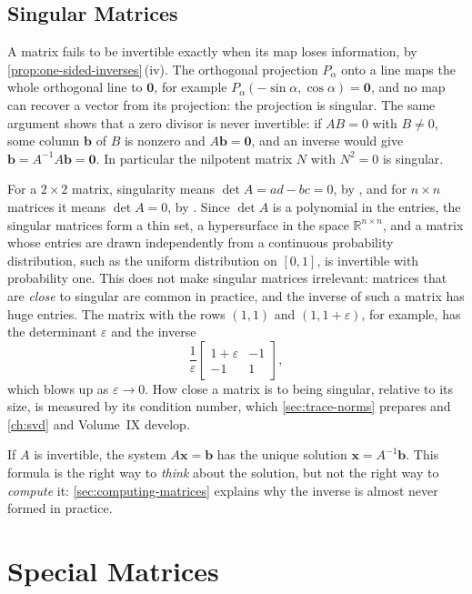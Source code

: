 \subsection{Singular Matrices}

A matrix fails to be invertible exactly when its map loses information, by \cref{prop:one-sided-inverses}\,(iv). The orthogonal projection $P_\alpha$ onto a line maps the whole orthogonal line to $\mathbf 0$, for example $P_\alpha(-\sin\alpha,\cos\alpha)=\mathbf 0$, and no map can recover a vector from its projection: the projection is singular. The same argument shows that a zero divisor is never invertible: if $AB=0$ with $B\ne0$, some column $\mathbf b$ of $B$ is nonzero and $A\mathbf b=\mathbf 0$, and an inverse would give $\mathbf b=A^{-1}A\mathbf b=\mathbf 0$. In particular the nilpotent matrix $N$ with $N^2=0$ is singular.

For a $2\times2$ matrix, singularity means $\det A=ad-bc=0$, by , and for $n\times n$ matrices it means $\det A=0$, by . Since $\det A$ is a polynomial in the entries, the singular matrices form a thin set, a hypersurface in the space $\mathbb R^{n\times n}$, and a matrix whose entries are drawn independently from a continuous probability distribution, such as the uniform distribution on $[0,1]$, is invertible with probability one. This does not make singular matrices irrelevant: matrices that are \emph{close} to singular are common in practice, and the inverse of such a matrix has huge entries. The matrix with the rows $(1,1)$ and $(1,1+\varepsilon)$, for example, has the determinant $\varepsilon$ and the inverse
\[
\frac1\varepsilon\begin{bmatrix}1+\varepsilon&-1\\-1&1\end{bmatrix},
\]
which blows up as $\varepsilon\to0$. How close a matrix is to being singular, relative to its size, is measured by its condition number, which \cref{sec:trace-norms} prepares and \cref{ch:svd} and Volume~IX develop.

If $A$ is invertible, the system $A\mathbf x=\mathbf b$ has the unique solution $\mathbf x=A^{-1}\mathbf b$. This formula is the right way to \emph{think} about the solution, but not the right way to \emph{compute} it: \cref{sec:computing-matrices} explains why the inverse is almost never formed in practice.

\section{Special Matrices}
\label{sec:special-matrices}

